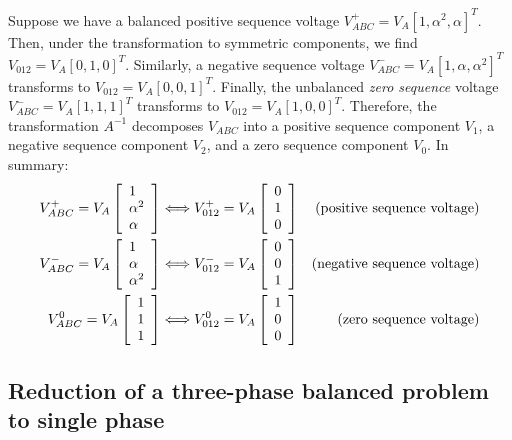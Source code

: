 \documentclass[10pt]{article}
\begin{document}
Suppose we have a balanced positive sequence voltage $V^+_{ABC} = V_A[1, \alpha^2, \alpha]^T$. Then, under the transformation to symmetric components, we find $V_{012} = V_A[0, 1, 0]^T$. Similarly, a negative sequence voltage $V^-_{ABC} = V_A[1, \alpha, \alpha^2]^T$ transforms to $V_{012} = V_A[0, 0, 1]^T$. Finally, the unbalanced \emph{zero sequence} voltage $V^-_{ABC} = V_A[1, 1, 1]^T$ transforms to $V_{012} = V_A[1, 0, 0]^T$. Therefore, the transformation $A^{-1}$ decomposes $V_{ABC}$ into a positive sequence component $V_1$, a negative sequence component $V_2$, and a zero sequence component $V_0$. In summary:
\begin{align}
V_{ABC}^+ = V_A\left[\begin{array}{l} 
	1 \\ \alpha^2 \\ \alpha 
\end{array}\right] &\Longleftrightarrow 
V_{012}^+ = V_A\left[\begin{array}{l} 
	0 \\ 1 \\ 0
\end{array}\right] & \text{(positive sequence voltage)}\notag \\
V_{ABC}^- = V_A\left[\begin{array}{l} 
	1 \\ \alpha \\ \alpha^2
\end{array}\right] &\Longleftrightarrow 
V_{012}^- = V_A\left[\begin{array}{l} 
	0 \\ 0 \\ 1
\end{array}\right] & \text{(negative sequence voltage)}\notag \\
V_{ABC}^0 = V_A\left[\begin{array}{l} 
	1 \\ 1 \\ 1
\end{array}\right] &\Longleftrightarrow 
V_{012}^0 = V_A\left[\begin{array}{l} 
	1 \\ 0 \\ 0
\end{array}\right] & \text{(zero sequence voltage)}\notag \\
\end{align}

\subsection{Reduction of a three-phase balanced problem to single phase}
\end{document}
